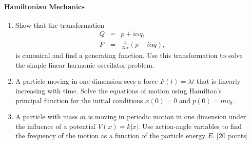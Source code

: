 \documentclass[letterpaper,11pt]{article}
\begin{document}
\paragraph*{Hamiltonian Mechanics}
\begin{enumerate}[resume]
 \item Show that the transformation
 \begin{eqnarray*}
  Q & = & p + i \alpha q, \\
  P & = & \frac{1}{2i\alpha}(p-i\alpha q),
 \end{eqnarray*}
 is canonical and find a generating function.  Use this transformation to solve the simple linear harmonic osccilator problem.
 \item A particle moving in one dimension sees a force $F(t) = \lambda t$ that is linearly increasing with time.  Solve the equations of motion using Hamilton's principal function for the initial conditions $x(0) = 0$ and $p(0) = mv_0$.
 \item A particle with mass $m$ is moving in periodic motion in one dimension under the influence of a potential $V(x) = k|x|$.  Use action-angle variables to find the frequency of the motion as a function of the particle energy $E$. [20 points]
 \begin{center}
 \end{center}
\end{enumerate}
\end{document}

